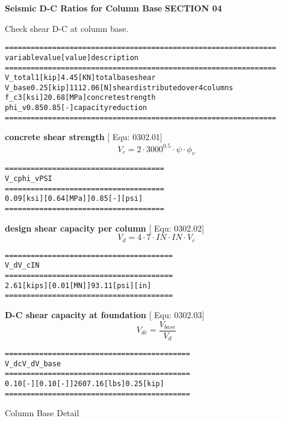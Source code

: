 \documentclass[12pt,notitle,letterpaper]{report}
\renewenvironment{quote}
  {\small\list{}{\rightmargin=0cm \leftmargin=0cm}%
   \item\relax}
  {\endlist}
\begin{document}
\vspace{.2in}   \textbf{Seismic D-C Ratios for Column Base}   \hfill\textbf{SECTION 04}
\newline   \vspace{.05in}   {\color{black}\hrulefill}

Check shear D-C at column base.

\begin{quote}
\begin{alltt}
==========  ==========  ===========  ================================
variable         value      [value]  description
==========  ==========  ===========  ================================
V_total        1 [kip]    4.45 [KN]  total base shear
V_base      0.25 [kip]  1112.06 [N]  shear distributed over 4 columns
f_c            3 [ksi]  20.68 [MPa]  concrete strength
phi_v             0.85     0.85 [-]  capacity reduction
==========  ==========  ===========  ================================
\end{alltt}
\end{quote}

\textbf{concrete shear strength} \hfill {[} Equ: 0302.01{]}
%
\begin{equation*}
V_{c} = 2 \cdot 3000^{0.5} \cdot \psi \cdot \phi_{v}
\end{equation*}
\begin{quote}
\begin{alltt}
========================  ========  =====
          V_c              phi_v     PSI
========================  ========  =====
0.09 [ksi]  [0.64 [MPa]]  0.85 [-]  [psi]
========================  ========  =====
\end{alltt}
\end{quote}

\textbf{design shear capacity per column} \hfill {[} Equ: 0302.02{]}
%
\begin{equation*}
V_{d} = 4 \cdot 7 \cdot IN \cdot IN \cdot V_{c}
\end{equation*}
\begin{quote}
\begin{alltt}
========================  ===========  ====
          V_d                 V_c       IN
========================  ===========  ====
2.61 [kips]  [0.01 [MN]]  93.11 [psi]  [in]
========================  ===========  ====
\end{alltt}
\end{quote}

\textbf{D-C shear capacity at foundation} \hfill {[} Equ: 0302.03{]}
%
\begin{equation*}
V_{dc} = \frac{V_{base}}{V_{d}}
\end{equation*}
\begin{quote}
\begin{alltt}
====================  =============  ==========
        V_dc               V_d         V_base
====================  =============  ==========
0.10 [-]  [0.10 [-]]  2607.16 [lbs]  0.25 [kip]
====================  =============  ==========
\end{alltt}
\end{quote}


Column Base Detail
\end{document}
